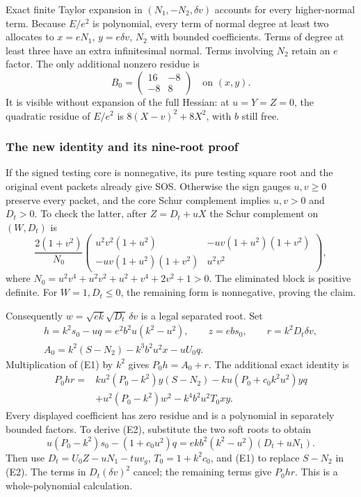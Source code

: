 Exact finite Taylor expansion in $(N_1,-N_2,\delta v)$ accounts for every higher-normal term. Because $E/e^2$ is polynomial, every term of normal degree at least two allocates to $x=eN_1$, $y=e\delta v$, $N_2$ with bounded coefficients. Terms of degree at least three have an extra infinitesimal normal. Terms involving $N_2$ retain an $e$ factor. The only additional nonzero residue is
\[
B_0=\begin{pmatrix}16&-8\\-8&8\end{pmatrix}
\quad\text{on }(x,y).
\]
It is visible without expansion of the full Hessian: at $u=Y=Z=0$, the quadratic residue of $E/e^2$ is $8(X-v)^2+8X^2$, with $b$ still free.

\subsubsection*{The new identity and its nine-root proof}
If the signed testing core is nonnegative, its pure testing square root and the original event packets already give SOS. Otherwise the sign gauges $u,v\ge0$ preserve every packet, and the core Schur complement implies $u,v>0$ and $D_t>0$. To check the latter, after $Z=D_t+uX$ the Schur complement on $(W,D_t)$ is
\[
\frac{2(1+v^2)}{N_0}
\begin{pmatrix}
u^2v^2(1+u^2)&-uv(1+u^2)(1+v^2)\\
-uv(1+u^2)(1+v^2)&u^2v^2
\end{pmatrix},
\]
where $N_0=u^2v^4+u^2v^2+u^2+v^4+2v^2+1>0$. The eliminated block is positive definite. For $W=1,D_t\le0$, the remaining form is nonnegative, proving the claim.

Consequently $w=\sqrt{ek}\sqrt{D_t}\,\delta v$ is a legal separated root. Set
\begin{gather*}
h=k^2s_0-uq=e^2b^2u(k^2-u^2),\qquad z=ebs_0,\qquad r=k^2D_t\delta v,\\
A_0=k^2(S-N_2)-k^3b^2u^2x-uU_0q.
\end{gather*}
Multiplication of (E1) by $k^2$ gives $P_0h=A_0+r$. The additional exact identity is
\begin{align*}
P_0hr={}&ku^2(P_0-k^2)y(S-N_2)
-ku(P_0+c_0k^2u^2)yq\\
&+u^2(P_0-k^2)w^2-k^4b^2u^2T_0xy. \tag{E2}
\end{align*}
Every displayed coefficient has zero residue and is a polynomial in separately bounded factors. To derive (E2), substitute the two soft roots to obtain
\[
u(P_0-k^2)s_0-(1+c_0u^2)q
=ekb^2(k^2-u^2)(D_t+uN_1).
\]
Then use $D_t=U_0Z-uN_1-tu v_g$, $T_0=1+k^2c_0$, and (E1) to replace $S-N_2$ in (E2). The terms in $D_t(\delta v)^2$ cancel; the remaining terms give $P_0hr$. This is a whole-polynomial calculation.


